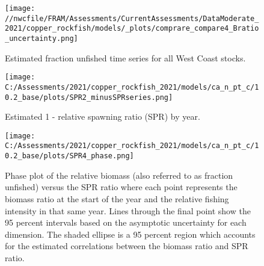 \documentclass[11pt,
  english,
  a4paper,
]{article}
\begin{document}
\tagmcend\tagstructend


\begin{figure}
\centering
\texttt{[image: //nwcfile/FRAM/Assessments/CurrentAssessments/DataModerate\_2021/copper\_rockfish/models/\_plots/comprare\_compare4\_Bratio\_uncertainty.png]}
\caption{Estimated fraction unfished time series for all West Coast stocks.\label{fig:depl-compare}}
\end{figure}

\tagmcend\tagstructend

\clearpage


\begin{figure}
\centering
\texttt{[image: C:/Assessments/2021/copper\_rockfish\_2021/models/ca\_n\_pt\_c/10.2\_base/plots/SPR2\_minusSPRseries.png]}
\caption{Estimated 1 - relative spawning ratio (SPR) by year.\label{fig:1-spr}}
\end{figure}

\tagmcend\tagstructend


\begin{figure}
\centering
\texttt{[image: C:/Assessments/2021/copper\_rockfish\_2021/models/ca\_n\_pt\_c/10.2\_base/plots/SPR4\_phase.png]}
\caption{Phase plot of the relative biomass (also referred to as fraction unfished) versus the SPR ratio where each point represents the biomass ratio at the start of the year and the relative fishing intensity in that same year. Lines through the final point show the 95 percent intervals based on the asymptotic uncertainty for each dimension. The shaded ellipse is a 95 percent region which accounts for the estimated correlations between the biomass ratio and SPR ratio.\label{fig:phase}}
\end{figure}
\end{document}
